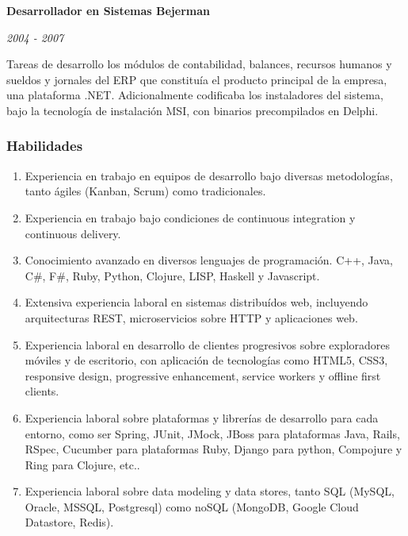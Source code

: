 \documentclass[a4paper,11pt]{article}
\begin{document}
\noindent \textbf{Desarrollador en Sistemas Bejerman}

\noindent \emph{2004 - 2007}

\noindent Tareas de desarrollo los módulos de contabilidad, balances, recursos
humanos y sueldos y jornales del ERP que constituía el producto principal de la
empresa, una plataforma .NET. Adicionalmente codificaba los instaladores del
sistema, bajo la tecnología de instalación MSI, con binarios precompilados en
Delphi. \\

\subsubsection{Habilidades}

\begin{enumerate}

  \item Experiencia en trabajo en equipos de desarrollo bajo diversas
    metodologías, tanto ágiles (Kanban, Scrum) como tradicionales.

  \item Experiencia en trabajo bajo condiciones de continuous integration y
    continuous delivery.

  \item Conocimiento avanzado en diversos lenguajes de programación. C++,
    Java, C\#, F\#, Ruby, Python, Clojure, LISP, Haskell y Javascript.

  \item Extensiva experiencia laboral en sistemas distribuídos web, incluyendo
    arquitecturas REST, microservicios sobre HTTP y aplicaciones web.

  \item Experiencia laboral en desarrollo de clientes progresivos sobre
    exploradores móviles y de escritorio, con aplicación de tecnologías como
    HTML5, CSS3, responsive design, progressive enhancement, service workers y
    offline first clients.

  \item Experiencia laboral sobre plataformas y librerías de desarrollo para
    cada entorno, como ser Spring, JUnit, JMock, JBoss para plataformas Java,
    Rails, RSpec, Cucumber para plataformas Ruby, Django para python, Compojure y Ring para
    Clojure, etc..

  \item Experiencia laboral sobre data modeling y data stores, tanto SQL
    (MySQL, Oracle, MSSQL, Postgresql) como noSQL (MongoDB, Google Cloud
    Datastore, Redis).


\end{enumerate}
\end{document}
